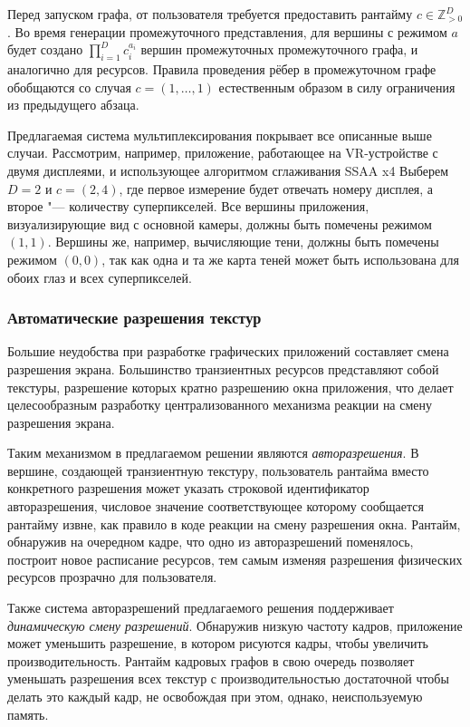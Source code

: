 Перед запуском графа, от пользователя требуется предоставить рантайму $c \in \mathbb{Z}_{>0}^D$.
Во время генерации промежуточного представления, для вершины с режимом $a$ будет создано $\prod_{i=1}^{D} c_i^{a_i}$ вершин  промежуточных промежуточного графа, и аналогично для ресурсов.
Правила проведения рёбер в промежуточном графе обобщаются со случая $c = \left(1, \dots, 1\right)$ естественным образом в силу ограничения из предыдущего абзаца.

Предлагаемая система мультиплексирования покрывает все описанные выше случаи.
Рассмотрим, например, приложение, работающее на VR-устройстве с двумя дисплеями, и использующее алгоритмом сглаживания SSAA x4
Выберем $D = 2$ и $c = (2, 4)$, где первое измерение будет отвечать номеру дисплея, а второе "--- количеству суперпикселей.
Все вершины приложения, визуализирующие вид с основной камеры, должны быть помечены режимом $(1, 1)$.
Вершины же, например, вычисляющие тени, должны быть помечены режимом $(0, 0)$, так как одна и та же карта теней может быть использована для обоих глаз и всех суперпикселей.

\subsubsection{Автоматические разрешения текстур}
Большие неудобства при разработке графических приложений составляет смена разрешения экрана.
Большинство транзиентных ресурсов представляют собой текстуры, разрешение которых кратно разрешению окна приложения, что делает целесообразным разработку централизованного механизма реакции на смену разрешения экрана.

Таким механизмом в предлагаемом решении являются \textit{авторазрешения}.
В вершине, создающей транзиентную текстуру, пользователь рантайма вместо конкретного разрешения может указать строковой идентификатор авторазрешения, числовое значение соответствующее которому сообщается рантайму извне, как правило в коде реакции на смену разрешения окна.
Рантайм, обнаружив на очередном кадре, что одно из авторазрешений поменялось, построит новое расписание ресурсов, тем самым изменяя разрешения физических ресурсов прозрачно для пользователя.

Также система авторазрешений предлагаемого решения поддерживает \textit{динамическую смену разрешений}.
Обнаружив низкую частоту кадров, приложение может уменьшить разрешение, в котором рисуются кадры, чтобы увеличить производительность.
Рантайм кадровых графов в свою очередь позволяет уменьшать разрешения всех текстур с производительностью достаточной чтобы делать это каждый кадр, не освобождая при этом, однако, неиспользуемую память.

